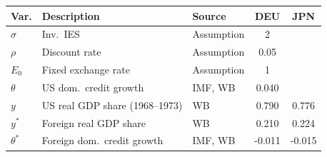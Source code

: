 \begin{tabular}{l l l c c}
\toprule
Var. & Description & Source & DEU & JPN \\
\midrule
\(\sigma\) & Inv.\ IES & Assumption & 2 & \\
\(\rho\) & Discount rate & Assumption & 0.05 & \\
\(E_0\) & Fixed exchange rate & Assumption & 1 & \\
\(\theta\) & US dom.\ credit growth & IMF, WB & 0.040 & \\
\midrule
\(y\) & US real GDP share (1968--1973) & WB & 0.790 & 0.776 \\
\(y^{*}\) & Foreign real GDP share & WB & 0.210 & 0.224 \\
\(\theta^{*}\) & Foreign dom.\ credit growth & IMF, WB & -0.011 & -0.015 \\
\bottomrule
\end{tabular}
